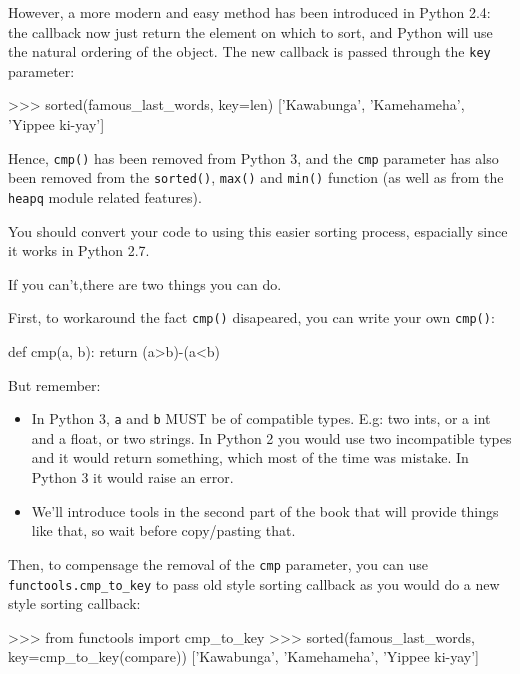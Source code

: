 However, a more modern and easy method has been introduced in Python 2.4: the callback now just return the element on which to sort, and Python will use the natural ordering of the object. The new callback is passed through the \lstinline{key} parameter:

\begin{py2and3}
>>> sorted(famous_last_words, key=len)
['Kawabunga', 'Kamehameha', 'Yippee ki-yay']
\end{py2and3}

Hence, \lstinline{cmp()} has been removed from Python 3, and the \lstinline{cmp} parameter has also been removed from the \lstinline{sorted()}, \lstinline{max()} and \lstinline{min()} function (as well as from the \lstinline{heapq} module related features).

You should convert your code to using this easier sorting process, espacially since it works in Python 2.7.

If you can't,there are two things you can do.

First, to workaround the fact \lstinline{cmp()} disapeared, you can write your own \lstinline{cmp()}:

\begin{py2and3}
def cmp(a, b):
    return (a>b)-(a<b)
\end{py2and3}

But remember:

\begin{itemize}
    \item In Python 3, \lstinline{a} and \lstinline{b} MUST be of compatible types. E.g: two ints, or a int and a float, or two strings. In Python 2 you would use two incompatible types and it would return something, which most of the time was mistake. In Python 3 it would raise an error.
    \item We'll introduce tools in the second part of the book that will provide things like that, so wait before copy/pasting that.
\end{itemize}

Then, to compensage the removal of the \lstinline{cmp} parameter, you can use \lstinline{functools.cmp_to_key} to pass old style sorting callback as you would do a new style sorting callback:

\begin{py2and3}
>>> from functools import cmp_to_key
>>> sorted(famous_last_words, key=cmp_to_key(compare))
['Kawabunga', 'Kamehameha', 'Yippee ki-yay']
\end{py2and3}

